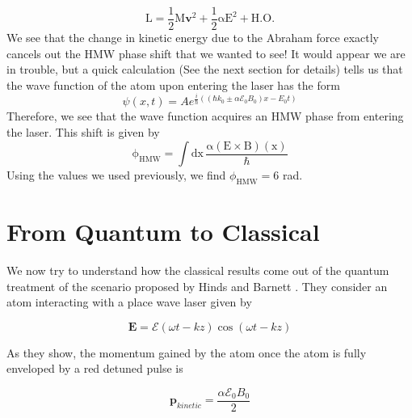 \documentclass[twocolumn,english,pra,aps,superscriptaddress,floatfix]{revtex4-1}
\begin{document}
\begin{equation}
\mathrm{L}=\frac{1}{2}\mathrm{M\mathbf{v}^2 +\frac{1}{2}\alpha E^2 +H.O.}
\label{lagrangian4}
\end{equation}
We see that the change in kinetic energy due to the Abraham force exactly cancels out the HMW phase shift that we wanted to see!  It would appear we are in trouble, but a quick calculation (See the next section for details) tells us that the wave function of the atom upon entering the laser has the form
\begin{equation}
\psi(x,t)=Ae^{\frac{i}{\hbar}((\hbar k_0 \pm\alpha\mathcal{E}_0B_0)x-E_0 t)}
\end{equation}
Therefore, we see that the wave function acquires an HMW phase from entering the laser.  This shift is given by
\begin{equation}
\mathrm{\phi_{HMW}=\int dx\,\frac{\alpha (E\times B)(x)}{\hbar}}
\end{equation}
Using the values we used previously, we find $\phi_{\mathrm{HMW}}=6$ rad.  
\section{From Quantum to Classical}
\label{sec:classical}
We now try to understand how the classical results come out of the quantum treatment of the scenario proposed by Hinds and Barnett \cite{hinds}.  They consider an atom interacting with a place wave laser given by

\begin{equation}
\mathbf{E}=\mathcal{E}(\omega t - kz)\cos{\left(\omega t - kz\right)}
\end{equation}

As they show, the momentum gained by the atom once the atom is fully enveloped by a red detuned pulse is

\begin{equation}
\mathbf{p}_{kinetic}=\frac{\alpha\mathcal{E}_0B_0}{2}
\end{equation}
\end{document}
